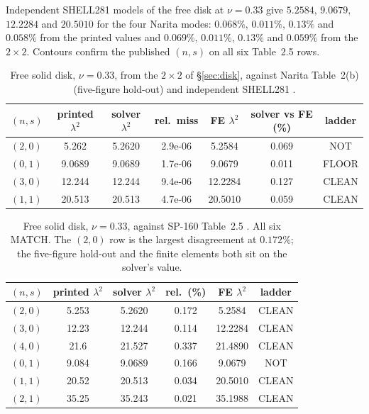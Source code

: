 \documentclass[11pt]{article}
\newcommand{\lamsq}{\lambda^{2}}
\begin{document}
Independent SHELL281 models of the free disk at $\nu=0.33$ give $5.2584$,
$9.0679$, $12.2284$ and $20.5010$ for the four Narita modes: $0.068\%$,
$0.011\%$, $0.13\%$ and $0.058\%$ from the printed values and $0.069\%$,
$0.011\%$, $0.13\%$ and $0.059\%$ from the $2\times2$. Contours confirm the
published $(n,s)$ on all six Table~2.5 rows.

\begin{table}[htbp]\centering\small
\caption{Free solid disk, $\nu=0.33$, from the $2\times2$ of \S\ref{sec:disk},
against Narita Table~2(b) \cite{narita1984} (five-figure hold-out) and
independent SHELL281 \cite{ansys}.}
\label{tab:narita2b}
\begin{tabular}{lcccccc}
\toprule
$(n,s)$ & printed $\lamsq$ & solver $\lamsq$ & rel.\ miss & FE $\lamsq$
& solver vs FE (\%) & ladder\\
\midrule
$(2,0)$ & 5.262 & 5.2620 & 2.9e-06 & 5.2584 & 0.069 & NOT \\
$(0,1)$ & 9.0689 & 9.0689 & 1.7e-06 & 9.0679 & 0.011 & FLOOR \\
$(3,0)$ & 12.244 & 12.244 & 9.4e-06 & 12.2284 & 0.127 & CLEAN \\
$(1,1)$ & 20.513 & 20.513 & 4.7e-06 & 20.5010 & 0.059 & CLEAN \\
\bottomrule
\end{tabular}
\end{table}

\begin{table}[htbp]\centering\small
\caption{Free solid disk, $\nu=0.33$, against SP-160 Table~2.5
\cite{leissaSP160}. All six MATCH. The $(2,0)$ row is the largest
disagreement at $0.172\%$; the five-figure hold-out and the finite elements
both sit on the solver's value.}
\label{tab:leissa25}
\begin{tabular}{lccccc}
\toprule
$(n,s)$ & printed $\lamsq$ & solver $\lamsq$ & rel.\ (\%) & FE $\lamsq$
& ladder\\
\midrule
$(2,0)$ & 5.253 & 5.2620 & 0.172 & 5.2584 & CLEAN \\
$(3,0)$ & 12.23 & 12.244 & 0.114 & 12.2284 & CLEAN \\
$(4,0)$ & 21.6 & 21.527 & 0.337 & 21.4890 & CLEAN \\
$(0,1)$ & 9.084 & 9.0689 & 0.166 & 9.0679 & NOT \\
$(1,1)$ & 20.52 & 20.513 & 0.034 & 20.5010 & CLEAN \\
$(2,1)$ & 35.25 & 35.243 & 0.021 & 35.1988 & CLEAN \\
\bottomrule
\end{tabular}
\end{table}
\end{document}
